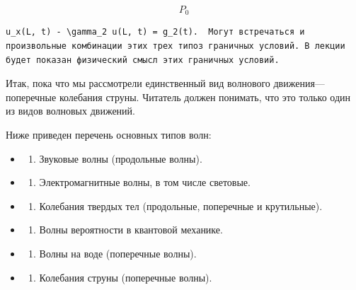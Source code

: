 \documentclass[
  ukrainian,
]{article}
\providecommand{\tightlist}{%
  \setlength{\itemsep}{0pt}\setlength{\parskip}{0pt}}
\begin{document}
\[
P_{0}
\]

\begin{verbatim}
u_x(L, t) - \gamma_2 u(L, t) = g_2(t).  Могут встречаться и произвольные комбинации этих трех типоз граничных условий. В лекции будет показан физический смысл этих граничных условий.
\end{verbatim}

Итак, пока что мы рассмотрели единственный вид волнового
движения---поперечные колебания струны. Читатель должен понимать, что
это только один из видов волновых движений.

Ниже приведен перечень основных типов волн:

\begin{itemize}
\tightlist
\item
  \begin{enumerate}
  \def\labelenumi{\arabic{enumi}.}
  \tightlist
  \item
    Звуковые волны (продольные волны).
  \end{enumerate}
\item
  \begin{enumerate}
  \def\labelenumi{\arabic{enumi}.}
  \setcounter{enumi}{1}
  \tightlist
  \item
    Электромагнитные волны, в том числе световые.
  \end{enumerate}
\item
  \begin{enumerate}
  \def\labelenumi{\arabic{enumi}.}
  \setcounter{enumi}{2}
  \tightlist
  \item
    Колебания твердых тел (продольные, поперечные и крутильные).
  \end{enumerate}
\item
  \begin{enumerate}
  \def\labelenumi{\arabic{enumi}.}
  \setcounter{enumi}{3}
  \tightlist
  \item
    Волны вероятности в квантовой механике.
  \end{enumerate}
\item
  \begin{enumerate}
  \def\labelenumi{\arabic{enumi}.}
  \setcounter{enumi}{4}
  \tightlist
  \item
    Волны на воде (поперечные волны).
  \end{enumerate}
\item
  \begin{enumerate}
  \def\labelenumi{\arabic{enumi}.}
  \setcounter{enumi}{5}
  \tightlist
  \item
    Колебания струны (поперечные волны).
  \end{enumerate}
\end{itemize}
\end{document}
